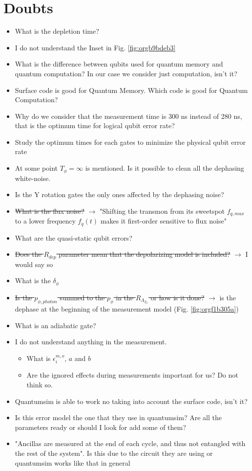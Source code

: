 \documentclass[11pt]{article}
\begin{document}
\section{Doubts}
\label{sec:org26f8be2}
\begin{itemize}
\item What is the depletion time?
\item I do not understand the Inset in Fig. \ref{fig:orgb9bdeb3}
\item What is the difference between qubits used for quantum memory and quantum computation? In our case we consider just computation, isn't it?
\item Surface code is good for Quantum Memory. Which code is good for Quantum Computation?
\item Why do we consider that the measurement time is 300 ns instead of 280 ns, that is the optimum time for logical qubit error rate?
\item Study the optimum times for each gates to minimize the physical qubit error rate
\item At some point \(T_{\phi} = \infty\) is mentioned. Is it possible to clean all the dephasing white-noise.
\item Is the Y rotation gates the only ones affected by the dephasing noise?
\item \sout{What is the flux noise?} \(\to\) "Shifting the transmon from its sweetspot \(f_{q,max}\) to a lower frequency \(f_q (t)\) makes it first-order sensitive to flux noise"
\item What are the quasi-static qubit errors?
\item \sout{Does the \(R_{dep}\) parameter mean that the depolarizing model is included?} \(\to\) I would say so
\item What is the \(\delta_{\phi}\)
\item \sout{Is the \(p_{\phi, photon}\) summed to the \(p_{\phi}\) in the \(R_{\Lambda_{T_{\phi}}}\) or how is it done?} \(\to\) is the dephase at the beginning of the measurement model (Fig. \ref{fig:orgf1b305a})
\item What is an adiabatic gate?
\item I do not understand anything in the measurement.
\begin{itemize}
\item What is \(\epsilon_i^{m,o}\), \(a\) and \(b\)
\item Are the ignored effects during measurements important for us? Do not think so.
\end{itemize}
\item Quantumsim is able to work no taking into account the surface code, isn't it?
\item Is this error model the one that they use in quantumsim? Are all the parameters ready or should I look for add some of them?
\item "Ancillas are measured at the end of each cycle, and thus not entangled with the rest of the system". Is this due to the circuit they are using or quantumsim works like that in general
\end{itemize}
\end{document}
